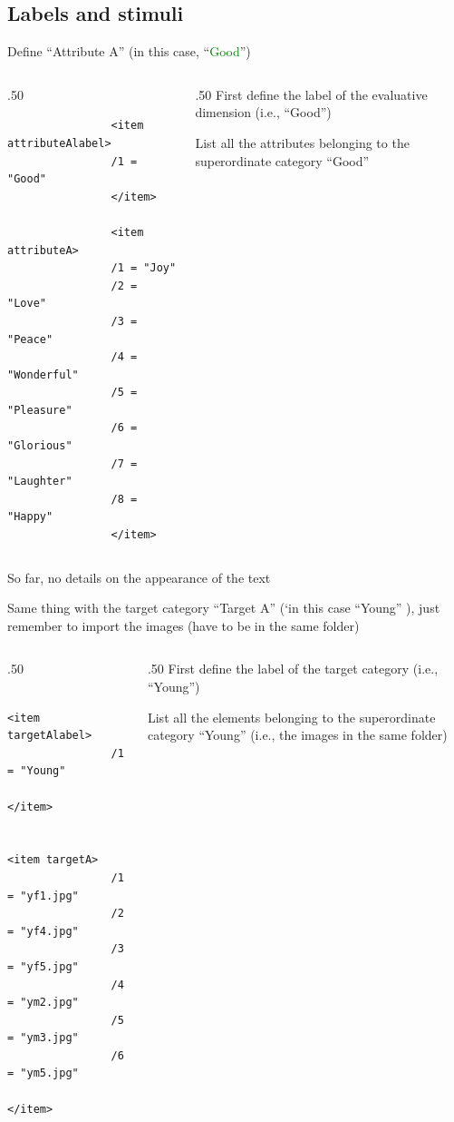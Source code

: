 \documentclass{beamer} %
\begin{document}
\subsection*{Labels and stimuli}

\begin{frame}[fragile]
	Define ``Attribute A'' (in this case, ``\textcolor{green}{Good}'')
	
	\begin{columns}
		\begin{column}[T]{.50\linewidth}
				\begin{verbatim}
				<item attributeAlabel>
				/1 = "Good"
				</item>
				
				<item attributeA>
				/1 = "Joy"
				/2 = "Love"
				/3 = "Peace"
				/4 = "Wonderful"
				/5 = "Pleasure"
				/6 = "Glorious"
				/7 = "Laughter"
				/8 = "Happy"
				</item>
			\end{verbatim}
		\end{column}
	
		\begin{column}[T]{.50\linewidth}
			\vspace{5mm}
		First define the label of the evaluative dimension (i.e., ``Good'')
		
		\vspace{10mm}
		
		List all the attributes belonging to the superordinate category ``Good''
	\end{column}
	\end{columns}
	\vspace{5mm}
	So far, no details on the appearance of the text

\end{frame}

\begin{frame}[fragile]
	Same thing with the target category ``Target A'' (`in this case ``Young'' ), just remember to import the images (have to be in the same folder)
	
	\begin{columns}
		\begin{column}[T]{.50\linewidth}
			\begin{verbatim}
				<item targetAlabel>
				/1 = "Young"
				</item>
				
				<item targetA>
				/1 = "yf1.jpg"
				/2 = "yf4.jpg"
				/3 = "yf5.jpg"
				/4 = "ym2.jpg"
				/5 = "ym3.jpg"
				/6 = "ym5.jpg"
				</item>
			\end{verbatim}
		\end{column}
		
		\begin{column}[T]{.50\linewidth}
			\vspace{5mm}
			First define the label of the target category (i.e., ``Young'')
			
			\vspace{10mm}
			
			List all the elements belonging to the superordinate category ``Young'' (i.e., the images in the same folder)
		\end{column}
	\end{columns}
	
\end{frame}
\end{document}
